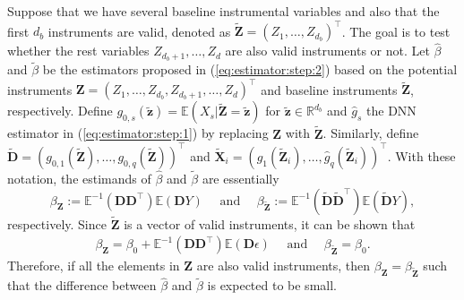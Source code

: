 \documentclass[11pt, preprint]{imsart}
\numberwithin{equation}{section}
\def \bfD{\mathbf{D}}
\def \bfX{\mathbf{X}}
\def \bfZ{\mathbf{Z}}
\def \bfz{\mathbf{z}}
\def \bfD{\mathbf{D}}
\def \ev{\mathbb{E}}
\theoremstyle{plain}
\theoremstyle{definition}
\begin{document}
Suppose that we have several baseline instrumental variables and also that the first $d_b$ instruments are valid, denoted as $\widetilde{\bfZ}=(Z_1, \ldots, Z_{d_b})^\top$. The goal is to test whether the rest variables $Z_{d_b+1},\ldots, Z_{d}$ are also valid instruments or not. Let $\widehat{\beta}$ and $\widetilde{\beta}$ be the estimators proposed in (\ref{eq:estimator:step:2}) based on the potential instruments $\bfZ=(Z_1,\ldots, Z_{d_b}, Z_{d_b+1},\ldots, Z_d)^\top$ and baseline instruments $\widetilde{\bfZ}$, respectively. Define $g_{0,s}(\widetilde{\bfz})=\ev(X_{s}|\widetilde{\bfZ}=\widetilde{\bfz})$ for $\widetilde{\bfz}\in \mathbb{R}^{d_b}$ and $\widehat{g}_s$ the DNN estimator in (\ref{eq:estimator:step:1}) by replacing $\bfZ$ with $\widetilde{\bfZ}$. Similarly, define $\widetilde{\bfD}=(g_{0,1}(\widetilde{\bfZ}),\ldots, g_{0,q}(\widetilde{\bfZ}))^\top$ and $\widetilde{\bfX}_i=(\widehat{g}_1(\widetilde{\bfZ}_i),\ldots, \widehat{g}_q(\widetilde{\bfZ}_i))^\top$. With these notation, the estimands of  $\widehat{\beta}$ and $\widetilde{\beta}$ are essentially $$\beta_{\bfZ}:=\ev^{-1}(\bfD\bfD^\top)\ev(\bfD Y)\quad\mbox{ and }\quad \beta_{\widetilde{\bfZ}}:=\ev^{-1}(\widetilde{\bfD}\widetilde{\bfD}^\top)\ev(\widetilde{\bfD} Y),$$ respectively.
Since $\widetilde{\bfZ}$ is a vector of valid instruments, it can be shown that
\begin{eqnarray*}
	\beta_{\bfZ}=\beta_0+\ev^{-1}(\bfD\bfD^\top)\ev(\bfD \epsilon)\quad \textrm{ and }\quad  \beta_{\widetilde{\bfZ}}=\beta_0.
\end{eqnarray*}
Therefore, if  all the elements in $\bfZ$ are  also valid instruments, then $\beta_{\bfZ}=\beta_{\widetilde{\bfZ}}$ such that the difference between $\widehat{\beta}$ and $\widetilde{\beta}$ is expected to be small. 
\end{document}
